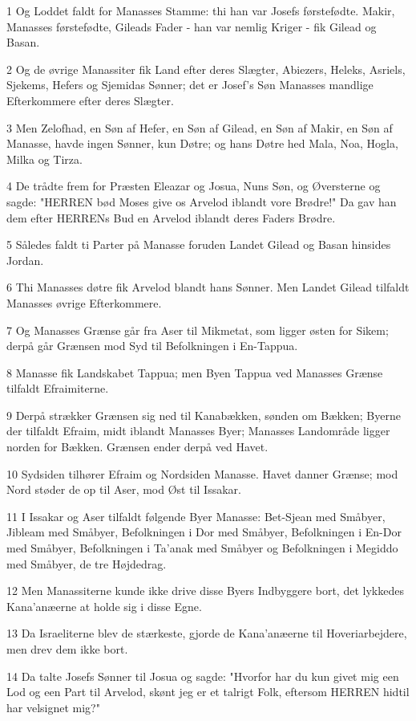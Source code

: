 \par 1 Og Loddet faldt for Manasses Stamme: thi han var Josefs førstefødte. Makir, Manasses førstefødte, Gileads Fader - han var nemlig Kriger - fik Gilead og Basan.
\par 2 Og de øvrige Manassiter fik Land efter deres Slægter, Abiezers, Heleks, Asriels, Sjekems, Hefers og Sjemidas Sønner; det er Josef's Søn Manasses mandlige Efterkommere efter deres Slægter.
\par 3 Men Zelofhad, en Søn af Hefer, en Søn af Gilead, en Søn af Makir, en Søn af Manasse, havde ingen Sønner, kun Døtre; og hans Døtre hed Mala, Noa, Hogla, Milka og Tirza.
\par 4 De trådte frem for Præsten Eleazar og Josua, Nuns Søn, og Øversterne og sagde: "HERREN bød Moses give os Arvelod iblandt vore Brødre!" Da gav han dem efter HERRENs Bud en Arvelod iblandt deres Faders Brødre.
\par 5 Således faldt ti Parter på Manasse foruden Landet Gilead og Basan hinsides Jordan.
\par 6 Thi Manasses døtre fik Arvelod blandt hans Sønner. Men Landet Gilead tilfaldt Manasses øvrige Efterkommere.
\par 7 Og Manasses Grænse går fra Aser til Mikmetat, som ligger østen for Sikem; derpå går Grænsen mod Syd til Befolkningen i En-Tappua.
\par 8 Manasse fik Landskabet Tappua; men Byen Tappua ved Manasses Grænse tilfaldt Efraimiterne.
\par 9 Derpå strækker Grænsen sig ned til Kanabækken, sønden om Bækken; Byerne der tilfaldt Efraim, midt iblandt Manasses Byer; Manasses Landområde ligger norden for Bækken. Grænsen ender derpå ved Havet.
\par 10 Sydsiden tilhører Efraim og Nordsiden Manasse. Havet danner Grænse; mod Nord støder de op til Aser, mod Øst til Issakar.
\par 11 I Issakar og Aser tilfaldt følgende Byer Manasse: Bet-Sjean med Småbyer, Jibleam med Småbyer, Befolkningen i Dor med Småbyer, Befolkningen i En-Dor med Småbyer, Befolkningen i Ta'anak med Småbyer og Befolkningen i Megiddo med Småbyer, de tre Højdedrag.
\par 12 Men Manassiterne kunde ikke drive disse Byers Indbyggere bort, det lykkedes Kana'anæerne at holde sig i disse Egne.
\par 13 Da Israeliterne blev de stærkeste, gjorde de Kana'anæerne til Hoveriarbejdere, men drev dem ikke bort.
\par 14 Da talte Josefs Sønner til Josua og sagde: "Hvorfor har du kun givet mig een Lod og een Part til Arvelod, skønt jeg er et talrigt Folk, eftersom HERREN hidtil har velsignet mig?"
